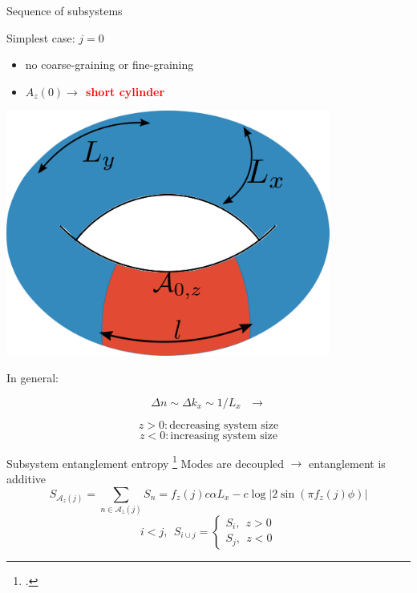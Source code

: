 \documentclass[11pt,aspectratio=169]{beamer}
\newcommand{\focus}[1]{\textcolor{red}{\bf{#1}}}
\begin{document}
\begin{frame}{Sequence of subsystems}
\hspace*{\fill}
\begin{minipage}{0.5\textwidth}
Simplest case: \(j=0\)\\[5pt]
\begin{itemize}
	\item no coarse-graining or fine-graining\\[20pt]
	\item \(A_z(0) \longrightarrow ~ ~\)\focus{short cylinder}
\end{itemize}
\end{minipage}
\hspace*{\fill}
\begin{minipage}{0.4\textwidth}
	\includegraphics[width=0.8\textwidth]{figures/A_m1.pdf}
\end{minipage}

\vspace*{\fill}
\centering
In general:

\begin{minipage}{0.33\textwidth}
	\[\Delta n \sim \Delta k_x \sim 1/L_x ~ ~ ~\longrightarrow \]
\end{minipage}
\begin{minipage}{0.33\textwidth}
	\[ z > 0: \text{decreasing system size}\]
	\[ z < 0: \text{increasing system size}\]
\end{minipage}
\end{frame}

\begin{frame}{Subsystem entanglement entropy}
\footcite{Calabrese_2004,Casini_2005,Arias_2015,Chen_2017,Murciano_2020}
Modes are decoupled \(\longrightarrow\) entanglement is additive
\vspace*{\fill}
\[S_{\mathcal{A}_z(j)} = \sum_{n \in \mathcal{A}_z(j)} S_n = f_z(j) c \alpha L_x - c \log \big|2\sin\left(\pi f_z(j)\phi\right)\big|\]
\[i < j, ~ ~ S_{i\cup j} =
	\begin{cases}
	S_{i}, ~ ~ z > 0\\
	S_{j}, ~ ~ z < 0
	\end{cases}
\]
\end{frame}
	
\end{document}
